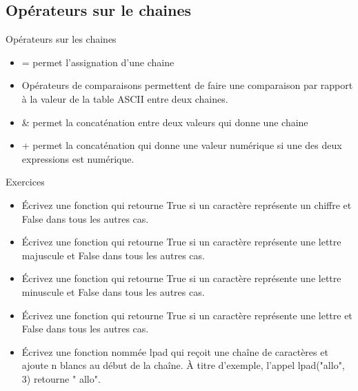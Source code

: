 \documentclass[aspectratio=169,usenames,dvipsnames]{beamer}
\begin{document}
    \subsection{Opérateurs sur le chaines}
    \begin{frame}[t]{Opérateurs sur les chaines}
        \begin{itemize}
            \item \alert{=} permet l’assignation d’une chaine
            \item Opérateurs de comparaisons permettent de faire une comparaison par rapport à la valeur de la table ASCII entre deux chaines.
            \item \alert{\&} permet la concaténation entre deux valeurs qui donne une chaine
            \item \alert{+} permet la concaténation qui donne une valeur numérique si une des deux expressions est numérique.
        \end{itemize}
    \end{frame}
    \begin{frame}{Exercices}
        \begin{itemize}
            \item Écrivez une fonction qui retourne True si un caractère représente un chiffre et False dans tous les autres cas.
            \item Écrivez une fonction qui retourne True si un caractère représente une lettre majuscule et False dans tous les autres cas.
            \item Écrivez une fonction qui retourne True si un caractère représente une lettre minuscule et False dans tous les autres cas.
            \item Écrivez une fonction qui retourne True si un caractère représente une lettre et False dans tous les autres cas.
            \item Écrivez une fonction nommée lpad qui reçoit une chaîne de caractères et ajoute n blancs au début de la chaîne.
                    À titre d'exemple, l'appel lpad("allo", 3) retourne " {} {} allo".

        \end{itemize}
    \end{frame}
\end{document}
